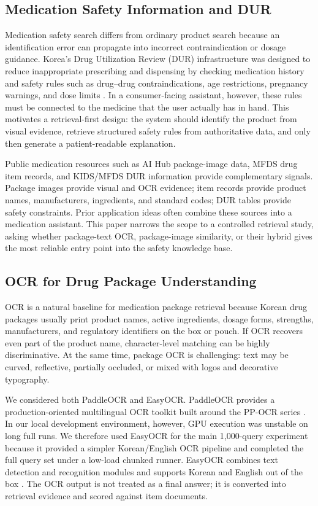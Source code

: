 \documentclass[sigconf,screen,nonacm]{acmart}
\begin{document}
\subsection{Medication Safety Information and DUR}
Medication safety search differs from ordinary product search because an identification error can propagate into incorrect contraindication or dosage guidance. Korea's Drug Utilization Review (DUR) infrastructure was designed to reduce inappropriate prescribing and dispensing by checking medication history and safety rules such as drug--drug contraindications, age restrictions, pregnancy warnings, and dose limits \cite{yoon2017dur}. In a consumer-facing assistant, however, these rules must be connected to the medicine that the user actually has in hand. This motivates a retrieval-first design: the system should identify the product from visual evidence, retrieve structured safety rules from authoritative data, and only then generate a patient-readable explanation.

Public medication resources such as AI Hub package-image data, MFDS drug item records, and KIDS/MFDS DUR information provide complementary signals. Package images provide visual and OCR evidence; item records provide product names, manufacturers, ingredients, and standard codes; DUR tables provide safety constraints. Prior application ideas often combine these sources into a medication assistant. This paper narrows the scope to a controlled retrieval study, asking whether package-text OCR, package-image similarity, or their hybrid gives the most reliable entry point into the safety knowledge base.

\subsection{OCR for Drug Package Understanding}
OCR is a natural baseline for medication package retrieval because Korean drug packages usually print product names, active ingredients, dosage forms, strengths, manufacturers, and regulatory identifiers on the box or pouch. If OCR recovers even part of the product name, character-level matching can be highly discriminative. At the same time, package OCR is challenging: text may be curved, reflective, partially occluded, or mixed with logos and decorative typography.

We considered both PaddleOCR and EasyOCR. PaddleOCR provides a production-oriented multilingual OCR toolkit built around the PP-OCR series \cite{paddleocr}. In our local development environment, however, GPU execution was unstable on long full runs. We therefore used EasyOCR for the main 1,000-query experiment because it provided a simpler Korean/English OCR pipeline and completed the full query set under a low-load chunked runner. EasyOCR combines text detection and recognition modules and supports Korean and English out of the box \cite{easyocr}. The OCR output is not treated as a final answer; it is converted into retrieval evidence and scored against item documents.
\end{document}
